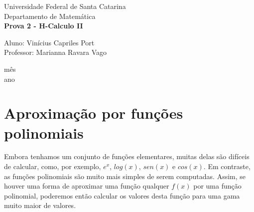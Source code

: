 \documentclass[a4paper, 12pt]{article}
\begin{document}

\begin{titlepage}
	\begin{center}


		\Huge{Universidade Federal de Santa Catarina}\\
		\large{Departamento de Matemática}\\
		\vspace{15pt}
		\vspace{95pt}
		\textbf{\LARGE{Prova 2 - H-Calculo II }}\\
		\vspace{3,5cm}
	\end{center}

	\begin{flushleft}
		\begin{tabbing}
			Aluno:  Vinícius Capriles Port\\
			Professor: Marianna Ravara Vago\\
		\end{tabbing}
	\end{flushleft}
	\vspace{1cm}

	\begin{center}
		\vspace{\fill}
		mês\\
		ano
	\end{center}
\end{titlepage}


\newpage
\tableofcontents
\thispagestyle{empty}

\newpage
{}
\section{Aproximação por funções polinomiais}

Embora tenhamos um conjunto de funções elementares, muitas delas são difíceis de calcular,
como, por exemplo, $e^x$, $log(x)$, $sen(x)$ e $cos(x)$. Em contraste,
as funções polinomiais são muito mais simples de serem computadas.
Assim, se houver uma forma de aproximar uma função qualquer $f(x)$ por uma função polinomial,
poderemos então calcular os valores desta função para uma gama muito maior de valores.
\end{document}
